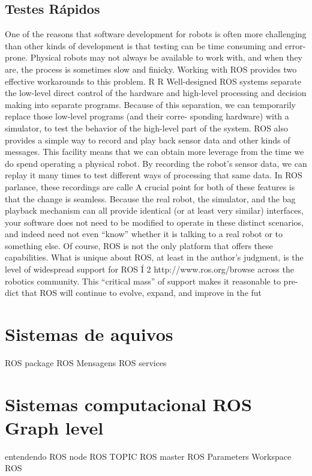 \subsection{Testes Rápidos}
One of the reasons that software development for robots is often more
challenging than other kinds of development is that testing can be time consuming and
error-prone. Physical robots may not always be available to work with, and when they
are, the process is sometimes slow and finicky. Working with ROS provides two effective
workarounds to this problem.
R
R
Well-designed ROS systems separate the low-level direct control of the hardware and
high-level processing and decision making into separate programs. Because of this
separation, we can temporarily replace those low-level programs (and their corre-
sponding hardware) with a simulator, to test the behavior of the high-level part of
the system.
ROS also provides a simple way to record and play back sensor data and other kinds
of messages. This facility means that we can obtain more leverage from the time
we do spend operating a physical robot. By recording the robot’s sensor data, we
can replay it many times to test different ways of processing that same data. In ROS
parlance, these recordings are calle
A crucial point for both of these features is that the change is seamless. Because the real
robot, the simulator, and the bag playback mechanism can all provide identical (or at least
very similar) interfaces, your software does not need to be modified to operate in these
distinct scenarios, and indeed need not even “know” whether it is talking to a real robot or
to something else.
Of course, ROS is not the only platform that offers these capabilities. What is unique
about ROS, at least in the author’s judgment, is the level of widespread support for ROS
Í 2 http://www.ros.org/browse
across the robotics community. This “critical mass” of support makes it reasonable to pre-
dict that ROS will continue to evolve, expand, and improve in the fut


\section{Sistemas de aquivos}
ROS package
ROS Mensagens
ROS services

\section{Sistemas computacional ROS Graph level}
entendendo ROS node
ROS TOPIC
ROS master
ROS Parameters
Workspace ROS


